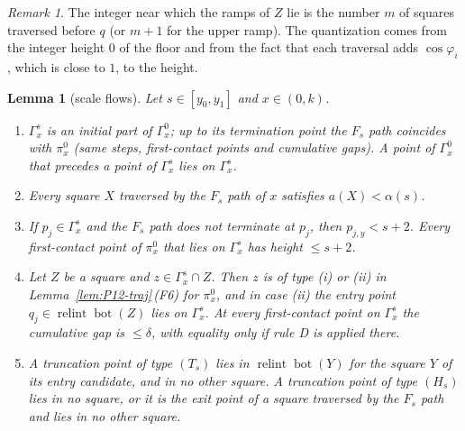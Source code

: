 \documentclass[11pt]{amsart}
\newcommand{\relint}{\operatorname{relint}}
\newcommand{\Bot}{\operatorname{bot}}
\newcommand{\Fs}{F_{s}}
\newtheorem{lemma}[theorem]{Lemma}
\theoremstyle{definition}
\theoremstyle{remark}
\newtheorem{remark}[theorem]{Remark}
\numberwithin{equation}{section}
\begin{document}
\begin{remark}\label{rem:P12-mechanism}
The integer near which the ramps of $Z$ lie is the number $m$ of squares traversed before $q$ (or $m+1$ for the upper ramp). The quantization comes from the integer height $0$ of the floor and from the fact that each traversal adds $\cos\varphi_i$, which is close to $1$, to the height.
\end{remark}

\begin{lemma}[scale flows]\label{lem:P12-Fs}
Let $s\in[y_0,y_1]$ and $x\in(0,k)$.
\begin{enumerate}[label=\textup{(\alph*)}]
\item $\Gamma^s_x$ is an initial part of $\Gamma^0_x$; up to its termination point the $\Fs$ path coincides with $\pi^0_x$ \textup{(}same steps, first-contact points and cumulative gaps\textup{)}. A point of $\Gamma^0_x$ that precedes a point of $\Gamma^s_x$ lies on $\Gamma^s_x$.
\item Every square $X$ traversed by the $\Fs$ path of $x$ satisfies $a(X)<\alpha(s)$.
\item If $p_j\in\Gamma^s_x$ and the $\Fs$ path does not terminate at $p_j$, then $p_{j,y}<s+2$. Every first-contact point of $\pi^0_x$ that lies on $\Gamma^s_x$ has height $\le s+2$.
\item Let $Z$ be a square and $z\in\Gamma^s_x\cap Z$. Then $z$ is of type \textup{(i)} or \textup{(ii)} in Lemma~\ref{lem:P12-traj}\,\textup{(F6)} for $\pi^0_x$, and in case \textup{(ii)} the entry point $q_j\in\relint\Bot(Z)$ lies on $\Gamma^s_x$. At every first-contact point on $\Gamma^s_x$ the cumulative gap is $\le\delta$, with equality only if rule D is applied there.
\item A truncation point of type $(T_s)$ lies in $\relint\Bot(Y)$ for the square $Y$ of its entry candidate, and in no other square. A truncation point of type $(H_s)$ lies in no square, or it is the exit point of a square traversed by the $\Fs$ path and lies in no other square.
\end{enumerate}
\end{lemma}
\end{document}
